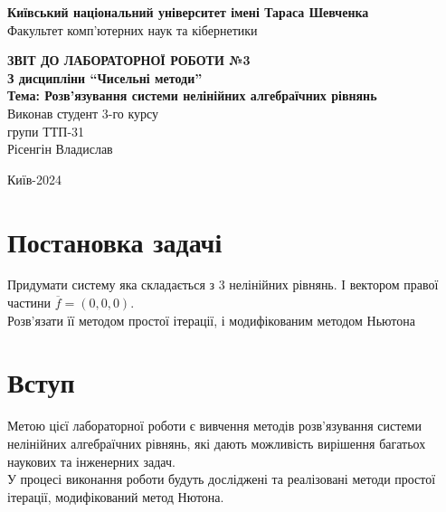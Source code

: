 \documentclass[a4paper, 12pt]{article}
\begin{document}
\begin{titlepage}
	\begin{center}
		\Large
		\textbf{Київський національний університет імені Тараса Шевченка} \\
		Факультет комп'ютерних наук та кібернетики \\

		\vspace{6cm}

		\textbf{\LARGE ЗВІТ ДО ЛАБОРАТОРНОЇ РОБОТИ №3} \\[0.5cm]
		\textbf{З дисципліни ``Чисельні методи''} \\[0.5cm]
		\textbf{Тема: Розв'язування системи нелінійних алгебраїчних рівнянь} \\

		\vfill
		\hspace{7cm} Виконав студент 3-го курсу \\
		\hspace{7cm} групи ТТП-31 \\
		\hspace{7cm} Рісенгін Владислав \\
		\vspace{2cm}

		Київ-2024
	\end{center}
\end{titlepage}

\newpage


\section{Постановка задачі}

Придумати систему яка складається з 3 нелінійних рівнянь. І вектором правої частини $\overline f = (0, 0, 0)$. \\

Розв'язати її методом простої ітерації, і модифікованим методом Ньютона

\section{Вступ}

Метою цієї лабораторної роботи є вивчення методів розв'язування системи нелінійних алгебраїчних рівнянь, 
які дають можливість вирішення багатьох наукових та інженерних задач. \\

У процесі виконання роботи будуть досліджені та реалізовані методи простої ітерації, модифікований метод Нютона.
\end{document}
